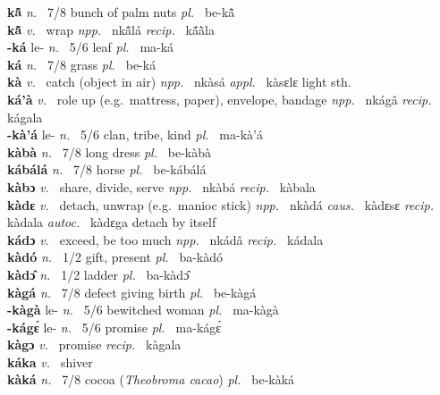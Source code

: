 \noindent
{\bfseries kã̂}  {\itshape n.~} 7/8 bunch of palm nuts {\itshape pl.~} be-kã̂    \\ 
{\bfseries kã̂}  {\itshape v.~} wrap   {\itshape npp.~} nkã̂lá {\itshape recip.~} kã́ã̀la  \\ 
{\bfseries -ká} le- {\itshape n.~} 5/6 leaf {\itshape pl.~} ma-ká    \\ 
{\bfseries ká}  {\itshape n.~} 7/8 grass {\itshape pl.~} be-ká    \\ 
{\bfseries kà}  {\itshape v.~} catch (object in air)   {\itshape npp.~} nkàsá {\itshape appl.~} kàsɛlɛ light sth.  \\ 
{\bfseries ká'à}  {\itshape v.~} role up (e.g.\ mattress, paper), envelope, bandage   {\itshape npp.~} nkágâ {\itshape recip.~} kágala  \\ 
{\bfseries -kà'á} le- {\itshape n.~} 5/6 clan, tribe, kind {\itshape pl.~} ma-kà'á    \\ 
{\bfseries kàbà}  {\itshape n.~} 7/8 long dress {\itshape pl.~} be-kàbà    \\ 
{\bfseries kábálá}  {\itshape n.~} 7/8 horse {\itshape pl.~} be-kábálá    \\ 
{\bfseries kàbɔ}  {\itshape v.~} share, divide, serve   {\itshape npp.~} nkàbá {\itshape recip.~} kàbala  \\ 
{\bfseries kàdɛ}  {\itshape v.~} detach, unwrap (e.g.\ manioc stick)   {\itshape npp.~} nkàdá {\itshape caus.~} kàdɛsɛ {\itshape recip.~} kàdala {\itshape autoc.~} kàdɛga detach by itself  \\ 
{\bfseries kádɔ}  {\itshape v.~} exceed, be too much   {\itshape npp.~} nkádâ {\itshape recip.~} kádala  \\ 
{\bfseries kàdó}  {\itshape n.~} 1/2 gift, present {\itshape pl.~} ba-kàdó    \\ 
{\bfseries kàdɔ̂}  {\itshape n.~} 1/2 ladder {\itshape pl.~} ba-kàdɔ̂   \\ 
{\bfseries kàgá}  {\itshape n.~} 7/8 defect giving birth {\itshape pl.~} be-kàgá    \\ 
{\bfseries -kàgà} le- {\itshape n.~} 5/6 bewitched woman {\itshape pl.~} ma-kàgà    \\ 
{\bfseries -kágɛ́} le- {\itshape n.~} 5/6 promise {\itshape pl.~} ma-kágɛ́    \\ 
{\bfseries kàgɔ}  {\itshape v.~} promise   {\itshape recip.~} kàgala  \\ 
{\bfseries káka}  {\itshape v.~} shiver    \\ 
{\bfseries kàká}  {\itshape n.~} 7/8 cocoa ({\itshape Theobroma cacao}) {\itshape pl.~} be-kàká    \\ 
